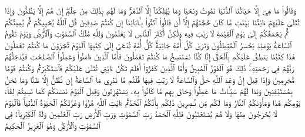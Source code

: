 وَقَالُواْ مَا هِيَ إِلَّا حَيَاتُنَا ٱلدُّنۡيَا نَمُوتُ وَنَحۡيَا وَمَا يُهۡلِكُنَآ إِلَّا ٱلدَّهۡرُۚ وَمَا لَهُم بِذَٰلِكَ مِنۡ عِلۡمٍۖ إِنۡ هُمۡ إِلَّا يَظُنُّونَ
وَإِذَا تُتۡلَىٰ عَلَيۡهِمۡ ءَايَٰتُنَا بَيِّنَٰتٖ مَّا كَانَ حُجَّتَهُمۡ إِلَّآ أَن قَالُواْ ٱئۡتُواْ بِـَٔابَآئِنَآ إِن كُنتُمۡ صَٰدِقِينَ
قُلِ ٱللَّهُ يُحۡيِيكُمۡ ثُمَّ يُمِيتُكُمۡ ثُمَّ يَجۡمَعُكُمۡ إِلَىٰ يَوۡمِ ٱلۡقِيَٰمَةِ لَا رَيۡبَ فِيهِ وَلَٰكِنَّ أَكۡثَرَ ٱلنَّاسِ لَا يَعۡلَمُونَ
وَلِلَّهِ مُلۡكُ ٱلسَّمَٰوَٰتِ وَٱلۡأَرۡضِۚ وَيَوۡمَ تَقُومُ ٱلسَّاعَةُ يَوۡمَئِذٖ يَخۡسَرُ ٱلۡمُبۡطِلُونَ
وَتَرَىٰ كُلَّ أُمَّةٖ جَاثِيَةٗۚ كُلُّ أُمَّةٖ تُدۡعَىٰٓ إِلَىٰ كِتَٰبِهَا ٱلۡيَوۡمَ تُجۡزَوۡنَ مَا كُنتُمۡ تَعۡمَلُونَ
هَٰذَا كِتَٰبُنَا يَنطِقُ عَلَيۡكُم بِٱلۡحَقِّۚ إِنَّا كُنَّا نَسۡتَنسِخُ مَا كُنتُمۡ تَعۡمَلُونَ
فَأَمَّا ٱلَّذِينَ ءَامَنُواْ وَعَمِلُواْ ٱلصَّـٰلِحَٰتِ فَيُدۡخِلُهُمۡ رَبُّهُمۡ فِي رَحۡمَتِهِۦۚ ذَٰلِكَ هُوَ ٱلۡفَوۡزُ ٱلۡمُبِينُ
وَأَمَّا ٱلَّذِينَ كَفَرُوٓاْ أَفَلَمۡ تَكُنۡ ءَايَٰتِي تُتۡلَىٰ عَلَيۡكُمۡ فَٱسۡتَكۡبَرۡتُمۡ وَكُنتُمۡ قَوۡمٗا مُّجۡرِمِينَ
وَإِذَا قِيلَ إِنَّ وَعۡدَ ٱللَّهِ حَقّٞ وَٱلسَّاعَةُ لَا رَيۡبَ فِيهَا قُلۡتُم مَّا نَدۡرِي مَا ٱلسَّاعَةُ إِن نَّظُنُّ إِلَّا ظَنّٗا وَمَا نَحۡنُ بِمُسۡتَيۡقِنِينَ
وَبَدَا لَهُمۡ سَيِّـَٔاتُ مَا عَمِلُواْ وَحَاقَ بِهِم مَّا كَانُواْ بِهِۦ يَسۡتَهۡزِءُونَ
وَقِيلَ ٱلۡيَوۡمَ نَنسَىٰكُمۡ كَمَا نَسِيتُمۡ لِقَآءَ يَوۡمِكُمۡ هَٰذَا وَمَأۡوَىٰكُمُ ٱلنَّارُ وَمَا لَكُم مِّن نَّـٰصِرِينَ
ذَٰلِكُم بِأَنَّكُمُ ٱتَّخَذۡتُمۡ ءَايَٰتِ ٱللَّهِ هُزُوٗا وَغَرَّتۡكُمُ ٱلۡحَيَوٰةُ ٱلدُّنۡيَاۚ فَٱلۡيَوۡمَ لَا يُخۡرَجُونَ مِنۡهَا وَلَا هُمۡ يُسۡتَعۡتَبُونَ
فَلِلَّهِ ٱلۡحَمۡدُ رَبِّ ٱلسَّمَٰوَٰتِ وَرَبِّ ٱلۡأَرۡضِ رَبِّ ٱلۡعَٰلَمِينَ
وَلَهُ ٱلۡكِبۡرِيَآءُ فِي ٱلسَّمَٰوَٰتِ وَٱلۡأَرۡضِۖ وَهُوَ ٱلۡعَزِيزُ ٱلۡحَكِيمُ